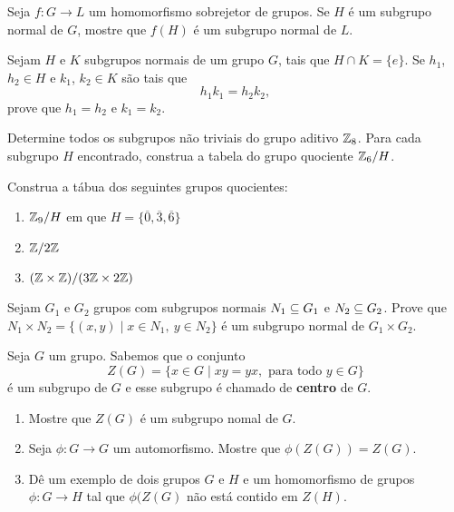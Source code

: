 \documentclass[12pt]{exam}
\begin{document}
    \questao{} Seja $f : G \to L$ um homomorfismo sobrejetor de grupos. Se $H$ \'e um subgrupo normal de $G$, mostre que $f(H)$ \'e um subgrupo normal de $L$.

    \vspace{.3cm}

    \questao{} Sejam $H$ e $K$ subgrupos normais de um grupo $G$, tais que $H \cap K = \{e\}$. Se $h_1$, $h_2 \in H$ e $k_1$, $k_2 \in K$ s\~ao tais que
    \[
      h_1k_1 = h_2k_2,
    \]
    prove que $h_1 = h_2$ e $k_1 = k_2$.

    \vspace{.3cm}

    \questao{} Determine todos os subgrupos n\~ao triviais do grupo aditivo $\mathbb{Z}_8$. Para cada subgrupo $H$ encontrado, construa a tabela do grupo quociente $\mathbb{Z}_6/H$.

    \vspace{.3cm}

    \questao{} Construa a t\'abua dos seguintes grupos quocientes:
    \begin{enumerate}[label=({\alph*})]
      \item $\mathbb{Z}_9/H$ em que $H = \{\overline{0}, \overline{3}, \overline{6}\}$

      \item $\mathbb{Z}/2\mathbb{Z}$

      \item $(\mathbb{Z} \times \mathbb{Z})/(3\mathbb{Z} \times 2\mathbb{Z})$
    \end{enumerate}

    \vspace{.3cm}

    \questao{} Sejam $G_1$ e $G_2$ grupos com subgrupos normais $N_1 \subseteq G_1$ e $N_2 \subseteq G_2$. Prove que $N_1 \times N_2 = \{ (x, y) \mid x \in N_1,\ y \in N_2\}$ é um subgrupo normal de $G_1 \times G_2$.

    \vspace{.3cm}

    \questao{} Seja $G$ um grupo. Sabemos que o conjunto
    \[
        Z(G) = \{x \in G \mid xy = yx, \mbox{ para todo } y \in G\}
    \]
    é um subgrupo de $G$ e esse subgrupo é chamado de \textbf{centro} de $G$.
    \begin{enumerate}[label=({\alph*})]
        \item Mostre que $Z(G)$ é um subgrupo nomal de $G$.

        \item Seja $\phi : G \to G$ um automorfismo. Mostre que $\phi(Z(G)) = Z(G)$.

        \item Dê um exemplo de dois grupos $G$ e $H$ e um homomorfismo de grupos $\phi : G \to H$ tal que $\phi(Z(G)$ não está contido em $Z(H)$.
    \end{enumerate}
\end{document}
